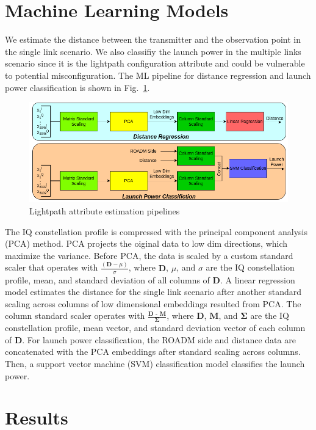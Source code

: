 \documentclass[lettersize,journal, one-column]{IEEEtran}
\begin{document}
\section{Machine Learning Models}
\label{section:ml_models}
We estimate the distance between the transmitter and the observation point in the single link scenario.
We also classifiy the launch power in the multiple links scenario since it is the lightpath configuration attribute and could be vulnerable to potential misconfiguration.
The ML pipeline for distance regression and launch power classification is shown in Fig.~\ref{figure:models}.
\begin{figure}
	\centering
    \includegraphics[width=\columnwidth]{figures/models.png}
    \caption{Lightpath attribute estimation pipelines}
	\label{figure:models}
\end{figure}
The IQ constellation profile is compressed with the principal component analysis (PCA) method.
PCA projects the oiginal data to low dim directions, which maximize the variance.
Before PCA, the data is scaled by a custom standard scaler that operates with $\frac{(\textbf{D}-\mu)}{\sigma}$, where $\textbf{D}$, $\mu$, and $\sigma$ are the IQ constellation profile, mean, and standard deviation of all columns of $\textbf{D}$.
A linear regression model estimates the distance for the single link scenario after another standard scaling across columns of low dimensional embeddings resulted from PCA.
The column standard scaler operates with $\frac{\textbf{D - M}}{\mathbf{\Sigma}}$, where $\textbf{D}$, $\textbf{M}$, and $\mathbf{\Sigma}$ are the IQ constellation profile, mean vector, and standard deviation vector of each column of $\textbf{D}$.
For launch power classification, the ROADM side and distance data are concatenated with the PCA embeddings after standard scaling across columns.
Then, a support vector machine (SVM) classification model classifies the launch power.

\section{Results}
\label{section:results}
\end{document}
